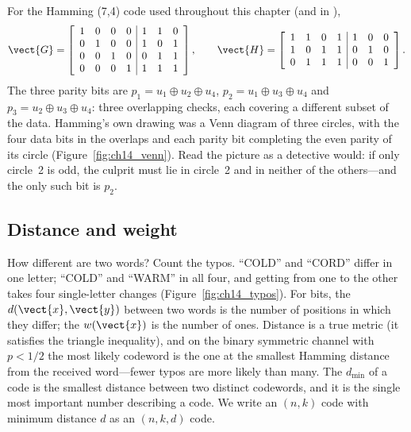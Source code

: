 For the Hamming (7,4) code used throughout this chapter (and in ),
\begin{equation}
\vect{G}=\left[\begin{array}{cccc|ccc}
1&0&0&0&1&1&0\\ 0&1&0&0&1&0&1\\ 0&0&1&0&0&1&1\\ 0&0&0&1&1&1&1
\end{array}\right],\qquad
\vect{H}=\left[\begin{array}{cccc|ccc}
1&1&0&1&1&0&0\\ 1&0&1&1&0&1&0\\ 0&1&1&1&0&0&1
\end{array}\right].
\label{eq:ch14:h74}
\end{equation}
The three parity bits are $p_1=u_1\oplus u_2\oplus u_4$, $p_2=u_1\oplus u_3\oplus u_4$ and
$p_3=u_2\oplus u_3\oplus u_4$: three overlapping checks, each covering a different subset of the
data. Hamming's own drawing was a Venn diagram of three circles, with the four data bits in the
overlaps and each parity bit completing the even parity of its circle
(Figure~\ref{fig:ch14_venn}). Read the picture as a detective would: if only circle~2 is odd, the
culprit must lie in circle~2 and in neither of the others---and the only such bit is $p_2$.

\subsection{Distance and weight}

How different are two words? Count the typos. ``COLD'' and ``CORD'' differ in one letter; ``COLD''
and ``WARM'' in all four, and getting from one to the other takes four single-letter changes
(Figure~\ref{fig:ch14_typos}). For bits, the  $d(\vect{x},\vect{y})$ between
two words is the number of positions in which they differ; the  $w(\vect{x})$ is
the number of ones. Distance is a true metric (it satisfies the triangle inequality), and on the
binary symmetric channel with $p<1/2$ the most likely codeword is the one at the smallest Hamming
distance from the received word---fewer typos are more likely than many. The  $d_{\min}$ of a code is the smallest distance between two distinct codewords, and it is the
single most important number describing a code. We write an $(n,k)$ code with minimum distance $d$ as
an $(n,k,d)$ code.


